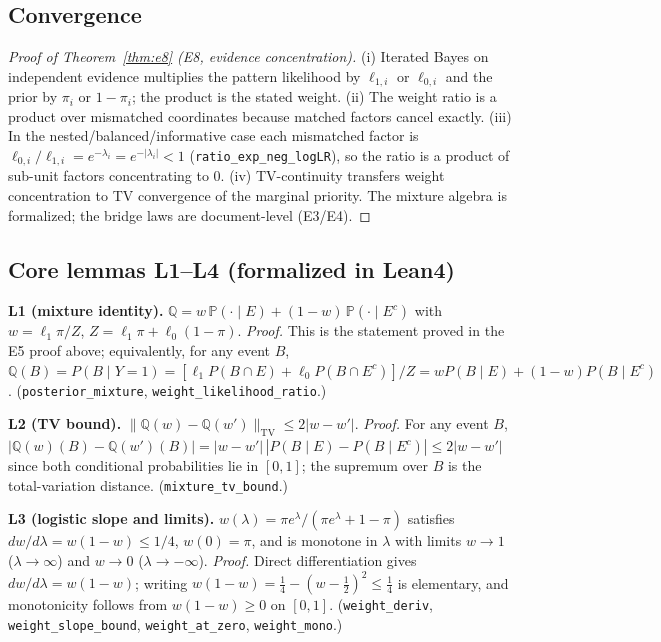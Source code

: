 \documentclass[11pt]{article}
\newcommand{\lean}[1]{\texttt{#1}}
\begin{document}
\subsection{Convergence}

\begin{proof}[Proof of Theorem~\ref{thm:e8} (E8, evidence concentration)]
(i) Iterated Bayes on independent evidence multiplies the pattern likelihood by
$\ell_{1,i}$ or $\ell_{0,i}$ and the prior by $\pi_i$ or $1-\pi_i$; the product is the stated
weight. (ii) The weight ratio is a product over mismatched coordinates because matched
factors cancel exactly. (iii) In the nested/balanced/informative case each mismatched factor
is $\ell_{0,i}/\ell_{1,i}=e^{-\lambda_i}=e^{-|\lambda_i|}<1$
(\lean{ratio\_exp\_neg\_logLR}), so the ratio is a product of sub-unit factors concentrating
to $0$. (iv) TV-continuity transfers weight concentration to TV convergence of the marginal
priority. The mixture algebra is formalized; the bridge laws are document-level (E3/E4).
\end{proof}

\subsection{Core lemmas L1--L4 (formalized in Lean4)}

\textbf{L1 (mixture identity).}
$\mathbb Q=w\,\mathbb P(\cdot\mid E)+(1-w)\,\mathbb P(\cdot\mid E^{c})$ with
$w=\ell_1\pi/Z$, $Z=\ell_1\pi+\ell_0(1-\pi)$. \emph{Proof.} This is the statement proved in
the E5 proof above; equivalently, for any event $B$,
$\mathbb Q(B)=P(B\mid Y{=}1)=\left[\ell_1P(B\cap E)+\ell_0P(B\cap E^{c})\right]/Z
=wP(B\mid E)+(1-w)P(B\mid E^{c})$.
(\lean{posterior\_mixture}, \lean{weight\_likelihood\_ratio}.)

\textbf{L2 (TV bound).}
$\|\mathbb Q(w)-\mathbb Q(w')\|_{\mathrm{TV}}\le 2|w-w'|$. \emph{Proof.} For any event $B$,
$|\mathbb Q(w)(B)-\mathbb Q(w')(B)|=|w-w'|\,|P(B\mid E)-P(B\mid E^{c})|\le 2|w-w'|$ since
both conditional probabilities lie in $[0,1]$; the supremum over $B$ is the total-variation
distance. (\lean{mixture\_tv\_bound}.)

\textbf{L3 (logistic slope and limits).}
$w(\lambda)=\pi e^{\lambda}/(\pi e^{\lambda}+1-\pi)$ satisfies $dw/d\lambda=w(1-w)\le1/4$,
$w(0)=\pi$, and is monotone in $\lambda$ with limits $w\to1$ ($\lambda\to\infty$) and
$w\to0$ ($\lambda\to-\infty$). \emph{Proof.} Direct differentiation gives
$dw/d\lambda=w(1-w)$; writing $w(1-w)=\tfrac14-(w-\tfrac12)^2\le\tfrac14$ is elementary, and
monotonicity follows from $w(1-w)\ge0$ on $[0,1]$. (\lean{weight\_deriv},
\lean{weight\_slope\_bound}, \lean{weight\_at\_zero}, \lean{weight\_mono}.)
\end{document}
